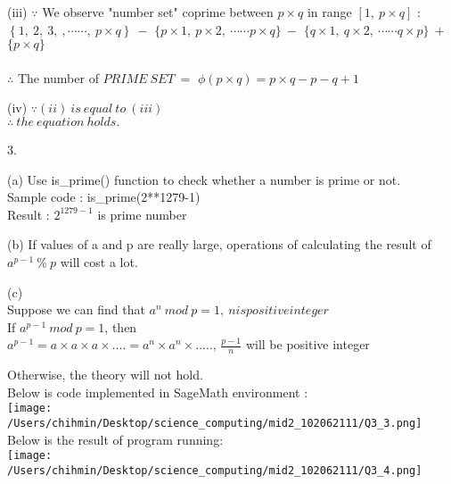 \documentclass{article}
\begin{document}
\begin{enumerate*}
\begin{enumerate*}
\begin{enumerate*}
          \item [(iii)]
          $\because$ We observe "number set" coprime between $p \times q$ in range $[1,\ p\times q]$ : \\
          $\left\{ 1,\ 2,\ 3,\ ,\cdots\cdots,\ p \times q \right\}\ -$
          $\{p \times 1,\ p \times 2,\ \cdots\cdots p\times q \}\ -$
          $\{q \times 1,\ q \times 2,\ \cdots\cdots q\times p \}\ +$
          $\{p \times q\}$ \\ \\
          $\therefore$ The number of $PRIME\ SET\ =$ 
          $\phi(p \times q)=p \times q - p - q + 1$ 
          \\

          \item [(iv)]
          $\because(ii)\ is\ equal\ to\ (iii)$ \\
          $\therefore\ the\ equation\ holds.$
           
        \end{enumerate*}
         
      \end{enumerate*}

      \item [3.]
      \begin{enumerate*}
        \item [(a)]
        Use is\_prime() function to check whether a number is prime or not.\\
        Sample code : is\_prime(2**1279-1) \\
        Result : $2^{1279-1}$ is prime number
        
        \item[(b)]
        If values of a and p are really large, operations of calculating the result of $a^{p-1}\ \%\ p$ will cost a lot.

        \item[(c)] \
        \\
        Suppose we can find that $a^{n}\ mod\ p=1,\ n is positive integer$ \\
        If $a^{p-1}\ mod\ p=1$, then \\
        $a^{p-1}=a \times a \times a \times .... =a^n \times a^n \times .....$, $\frac{p-1}{n}$ will be positive integer

        Otherwise, the theory will not hold. \\
        Below is code implemented in SageMath environment : \\
        \texttt{[image: /Users/chihmin/Desktop/science\_computing/mid2\_102062111/Q3\_3.png]} \\
        
        Below is the result of program running:\\
        \texttt{[image: /Users/chihmin/Desktop/science\_computing/mid2\_102062111/Q3\_4.png]}
         
    \end{enumerate*}
  \end{enumerate*}
\end{document}
